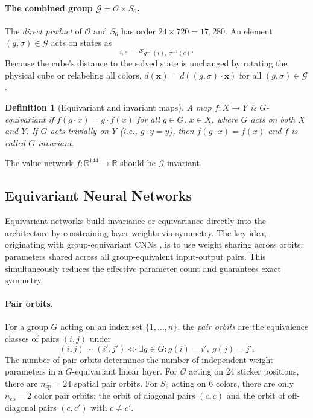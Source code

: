 \documentclass[11pt]{article}
\newtheorem{definition}[theorem]{Definition}
\newcommand{\bx}{\mathbf{x}}
\newcommand{\R}{\mathbb{R}}
\begin{document}
\paragraph{The combined group $\mathcal{G} = \mathcal{O} \times S_6$.}
The \emph{direct product} of $\mathcal{O}$ and $S_6$ has order
$24 \times 720 = 17{,}280$.
An element $(g, \sigma) \in \mathcal{G}$ acts on states as
\begin{equation}
  [(g, \sigma) \cdot \bx]_{i,c} = x_{g^{-1}(i),\; \sigma^{-1}(c)}.
  \label{eq:combined_action}
\end{equation}
Because the cube's distance to the solved state is unchanged by rotating
the physical cube or relabeling all colors, $d(\bx) = d((g, \sigma) \cdot \bx)$
for all $(g, \sigma) \in \mathcal{G}$.

\begin{definition}[Equivariant and invariant maps]
A map $f: X \to Y$ is \emph{$G$-equivariant} if
$f(g \cdot x) = g \cdot f(x)$ for all $g \in G$, $x \in X$,
where $G$ acts on both $X$ and $Y$.
If $G$ acts trivially on $Y$ (i.e., $g \cdot y = y$), then
$f(g \cdot x) = f(x)$ and $f$ is called \emph{$G$-invariant}.
\end{definition}

The value network $f: \R^{144} \to \R$ should be $\mathcal{G}$-invariant.

\subsection{Equivariant Neural Networks}

Equivariant networks build invariance or equivariance directly into the
architecture by constraining layer weights via symmetry.
The key idea, originating with group-equivariant CNNs
\cite{cohen2016group}, is to use weight sharing across orbits:
parameters shared across all group-equivalent input-output pairs.
This simultaneously reduces the effective parameter count and guarantees
exact symmetry.

\paragraph{Pair orbits.}
For a group $G$ acting on an index set $\{1, \ldots, n\}$, the
\emph{pair orbits} are the equivalence classes of pairs $(i, j)$ under
\begin{equation}
  (i, j) \sim (i', j') \iff \exists g \in G : g(i) = i',\ g(j) = j'.
\end{equation}
The number of pair orbits determines the number of independent weight
parameters in a $G$-equivariant linear layer.
For $\mathcal{O}$ acting on 24 sticker positions, there are
$n_{\mathrm{sp}} = 24$ spatial pair orbits.
For $S_6$ acting on 6 colors, there are only $n_{\mathrm{co}} = 2$
color pair orbits: the orbit of diagonal pairs $(c, c)$ and the orbit of
off-diagonal pairs $(c, c')$ with $c \neq c'$.
\end{document}

